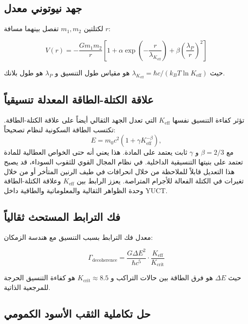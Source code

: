 \documentclass[11pt,a4paper]{article}
\theoremstyle{remark}
\newcommand{\Keff}{K_{\mathrm{eff}}}
\begin{document}
	\subsection{جهد نيوتوني معدل}
	
	لكتلتين $m_1, m_2$ تفصل بينهما مسافة $r$:
	
	\begin{equation}
		V(r) = -\frac{G m_1 m_2}{r} \left[ 1 + \alpha \exp\left(-\frac{r}{\lambda_{\Keff}}\right) + \beta \left(\frac{\lambda_P}{r}\right)^2 \right]
	\end{equation}
	
	حيث $\lambda_{\Keff} = \hbar c / (k_B T \ln \Keff)$ هو مقياس طول التنسيق و $\lambda_P$ هو طول بلانك.
	
	\subsection{علاقة الكتلة-الطاقة المعدلة تنسيقياً}
	\label{subsec:coord-emc2-G}
	
	تؤثر كفاءة التنسيق نفسها $\Keff$ التي تعدل الجهد الثقالي أيضاً على علاقة الكتلة-الطاقة. تكتسب الطاقة السكونية لنظام تصحيحاً:
	\[
	E = m_{0} c^{2} \left(1 + \gamma K_{\mathrm{eff}}^{-\beta}\right),
	\]
	مع $\beta = 2/3$ و $\gamma$ ثابت يعتمد على المادة. هذا يعني أنه حتى الخواص العطالية للمادة تعتمد على بنيتها التنسيقية الداخلية. في نظام المجال القوي للثقوب السوداء، قد يصبح هذا التعديل قابلاً للملاحظة من خلال انحرافات في طيف الرنين المتأخر أو من خلال تغيرات في الكتلة الفعالة للأجرام المتراصة. يعزز الرابط بين $\Keff$ وعلاقة الكتلة-الطاقة وحدة الظواهر الثقالية والمعلوماتية والطاقية داخل YUCT.
	
	\subsection{فك الترابط المستحث ثقالياً}
	
	معدل فك الترابط بسبب التنسيق مع هندسة الزمكان:
	
	\begin{equation}
		\Gamma_{\text{decoherence}} = \frac{G \Delta E^2}{\hbar c^5} \cdot \frac{\Keff}{K_{\text{crit}}}
	\end{equation}
	
	حيث $\Delta E$ هو فرق الطاقة بين حالات التراكب و $K_{\text{crit}} \approx 8.5$ هو كفاءة التنسيق الحرجة للمرجعية الذاتية.
	
	\subsection{حل تكاملية الثقب الأسود الكمومي}
	
\end{document}
